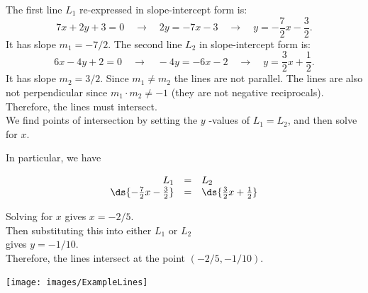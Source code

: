 \begin{solution} 
The first line $L_{1}$ re-expressed in slope-intercept form is:
$$7x+2y+3=0\quad\to\quad 2y=-7x-3\quad\to\quad y=-\frac{7}{2}x-\frac{3}{2}.$$
It has slope $m_1=-7/2$.
The second line $L_{2}$ in slope-intercept form is:
$$6x-4y+2=0\quad\to\quad -4y=-6x-2\quad\to\quad y=\frac{3}{2}x+\frac{1}{2}.$$
It has slope $m_2=3/2$. Since $m_1\neq m_2$ the lines are not parallel. The lines are also not perpendicular since $m_1\cdot m_2\neq -1$ (they are not negative reciprocals). Therefore, the lines must intersect.\\
We find points of intersection by setting the $y$ -values of $L_{1} = L_{2}$, and then solve for $x$.

\begin{minipage}{0.6\textwidth}
	In particular, we have
	
	$$\begin{array}{rcl}
	L_{1} & = & L_{2} \\
	\ds{-\frac{7}{2}x-\frac{3}{2}} & = & \ds{\frac{3}{2}x+\frac{1}{2}} \\
	\end{array} $$
	
Solving for $x$ gives $x=-2/5$. \\

Then substituting this 
into either $L_{1}$ or $L_{2}$ \\
gives $y=-1/10$.\\
 
Therefore, the lines intersect at the point $(-2/5,-1/10)$.

\vspace{2cm}
\end{minipage}
\begin{minipage}{0.35\textwidth}
	
\vspace{3mm}	
\hspace{3mm}\texttt{[image: images/ExampleLines]}
\end{minipage}
\end{solution}


